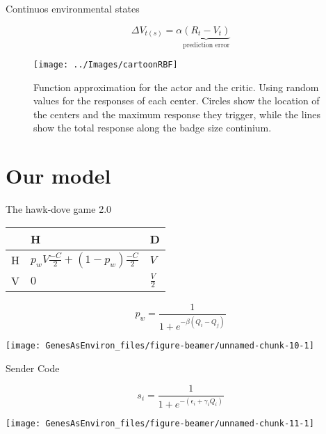 \documentclass[
  ignorenonframetext,
]{beamer}
\begin{document}
\begin{frame}{Continuos environmental states}
\protect\hypertarget{continuos-environmental-states}{}

\begin{equation*}
  \Delta V_{t(s)}=\alpha \underbrace{(R_t-V_t)}_\text{prediction error}
\end{equation*}

\begin{figure}
\texttt{[image: ../Images/cartoonRBF]} \caption{\label{fig:learning_cartoonRBF}Function approximation for the actor and the critic. Using random values for the responses of each center. Circles show the location of the centers and the maximum response they trigger, while the lines show the total response along the badge size continium.}\label{fig:fig2}
\end{figure}

\end{frame}

\hypertarget{our-model}{%
\section{Our model}\label{our-model}}

\begin{frame}{The hawk-dove game 2.0}
\protect\hypertarget{the-hawk-dove-game-2.0}{}

\begin{center}
\begin{tabular}{ >{\centering\arraybackslash}p{1cm} | >{\centering\arraybackslash}p{4.5cm} | >{\centering\arraybackslash}p{4.5cm} }
& H & D \\ \hline
H & $p_w V\frac{-C}{2} + (1-p_w) \frac{-C}{2}$ & $V$ \\ \hline
V & $0$ & $\frac{V}{2}$\\
\end{tabular}
\end{center}

\begin{equation*}
p_w=\frac{1}{1+e^{-\beta(Q_i-Q_j)}}
\end{equation*}

\begin{center}\texttt{[image: GenesAsEnviron\_files/figure-beamer/unnamed-chunk-10-1]} \end{center}

\end{frame}

\begin{frame}{Sender Code}
\protect\hypertarget{sender-code}{}

\begin{equation*}
s_i = \frac{1}{1+e^{-(\epsilon_i+\gamma_iQ_i)}}
\label{eq:react_norm}
\end{equation*}

\begin{center}\texttt{[image: GenesAsEnviron\_files/figure-beamer/unnamed-chunk-11-1]} \end{center}

\end{frame}
\end{document}
